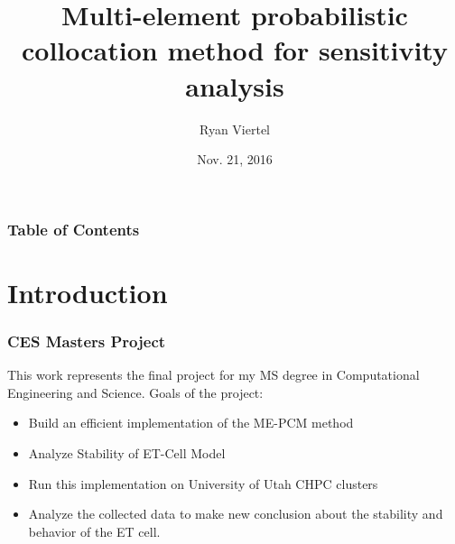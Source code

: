 \documentclass{beamer}
\title{Multi-element probabilistic collocation method for sensitivity analysis}
\author{Ryan Viertel}
\institute{University of Utah}
\date{Nov. 21, 2016}
\theoremstyle{plain}
\theoremstyle{definition}
\begin{document}
\begin{frame}
\titlepage
\end{frame}

\begin{frame}
\frametitle{Table of Contents}
\tableofcontents
\end{frame}


\section{Introduction}

\begin{frame}\frametitle{CES Masters Project}
  This work represents the final project for my MS degree in Computational Engineering and Science.
\newline
\newline
  Goals of the project:
  \begin{itemize}
    \item Build an efficient implementation of the ME-PCM method%
    \item Analyze Stability of ET-Cell Model
    \item Run this implementation on University of Utah CHPC clusters%
    \item Analyze the collected data to make new conclusion about the stability and behavior of the ET cell.
  \end{itemize}
\end{frame}
\end{document}
